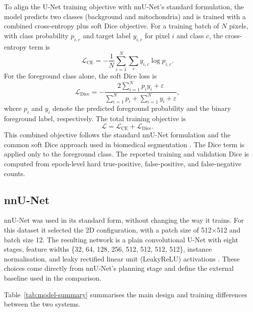 \documentclass[logo,bsc,singlespacing,parskip,online]{infthesis}
\begin{document}
To align the U-Net training objective with nnU-Net's standard formulation, the model predicts two classes
(background and mitochondria) and is trained with a combined cross-entropy plus
soft Dice objective. For a training batch of $N$ pixels, with class probability
$p_{i,c}$ and target label $y_{i,c}$ for pixel $i$ and class $c$, the
cross-entropy term is
\[
\mathcal{L}_{\mathrm{CE}} = - \frac{1}{N} \sum_{i=1}^{N} \sum_{c} y_{i,c} \log p_{i,c}.
\]
For the foreground class alone, the soft Dice loss is
\[
\mathcal{L}_{\mathrm{Dice}} =
- \frac{2 \sum_{i=1}^{N} p_i y_i + \varepsilon}
{\sum_{i=1}^{N} p_i + \sum_{i=1}^{N} y_i + \varepsilon},
\]
where $p_i$ and $y_i$ denote the predicted foreground probability and the
binary foreground label, respectively. The total training objective is
\[
\mathcal{L} = \mathcal{L}_{\mathrm{CE}} + \mathcal{L}_{\mathrm{Dice}}.
\]
This combined objective follows the standard nnU-Net formulation and the common
soft Dice approach used in biomedical segmentation \citep{isensee2021nnu,
milletari2016vnet}. The Dice term is applied only to the foreground class. The
reported training and validation Dice is computed from epoch-level hard
true-positive, false-positive, and false-negative counts. 

\subsection{nnU-Net}

nnU-Net was used in its standard form, without changing the way it trains. For
this dataset it selected the 2D configuration, with a
patch size of 512$\times$512 and batch size 12. The resulting network is a
plain convolutional U-Net with eight stages, feature widths
\{32, 64, 128, 256, 512, 512, 512, 512\}, instance normalisation, and leaky
rectified linear unit (LeakyReLU) activations \citep{maas2013rectifier}. These choices come directly from nnU-Net's
planning stage and define the external baseline used in the comparison.

Table~\ref{tab:model-summary} summarises the main design and training
differences between the two systems.
\end{document}
